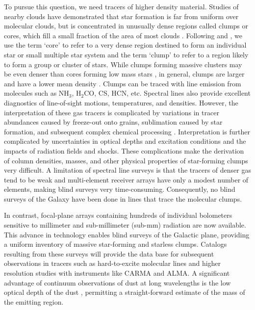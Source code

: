 \documentclass{emulateapj}
\newcommand{\ammonia}{\mbox{{\rm NH}$_3$}}
\newcommand{\form}{H$_2$CO}
\begin{document}
To pursue this question, we need tracers of higher density material.
Studies of nearby clouds have demonstrated that star formation is far
from uniform over molecular clouds, but is concentrated in unusually
dense regions called clumps or cores, which fill a small fraction of
the area of most clouds \citep{lada91,enoch07,evans09}.
Following \citet{williams00} and \citet{mckee07}, we use
the term `core' to refer to a very dense region destined to form an individual
star or small multiple star system and the term `clump' to refer to a region
likely to form a group or cluster of stars. While clumps forming massive
clusters may be even denser than cores forming low mass stars 
\citep{mueller02}, in general, clumps are larger and have a lower mean 
density \citep{mckee07}. Clumps can be
traced with line emission from molecules such as \ammonia, \form, CS, HCN, etc.
Spectral lines also provide excellent diagnostics of line-of-sight motions,
temperatures, and densities.  However, the interpretation of these gas tracers
is complicated by variations in tracer abundances caused by freeze-out onto
grains, sublimation caused by star formation, and subsequent
complex chemical processing \citep{vandishoeck98}. Interpretation is
further complicated by uncertainties in optical depths and excitation
conditions and the impacts of radiation fields and shocks. These complications
make the derivation of column densities, masses, and other physical properties
of star-forming clumps very difficult.  A limitation of spectral line surveys
is that the tracers of denser gas tend to be weak and multi-element receiver
arrays have only a modest number of elements, making blind surveys very
time-consuming. Consequently, no blind surveys of the Galaxy have been done
in lines that trace the molecular clumps.

In contrast, focal-plane arrays containing hundreds of individual
bolometers sensitive to millimeter and sub-millimeter (sub-mm)
radiation are now available. This advance in technology enables blind
surveys of the Galactic plane, providing a uniform inventory of
massive star-forming and starless clumps.  Catalogs resulting from
these surveys will provide the data base for subsequent observations
in tracers such as hard-to-excite molecular lines and higher
resolution studies with instruments like CARMA and ALMA.  A
significant advantage of continuum observations of dust at long
wavelengths is the low optical depth of the dust \citep{johnstone06},
permitting a straight-forward estimate of the mass of the emitting
region.
\end{document}
